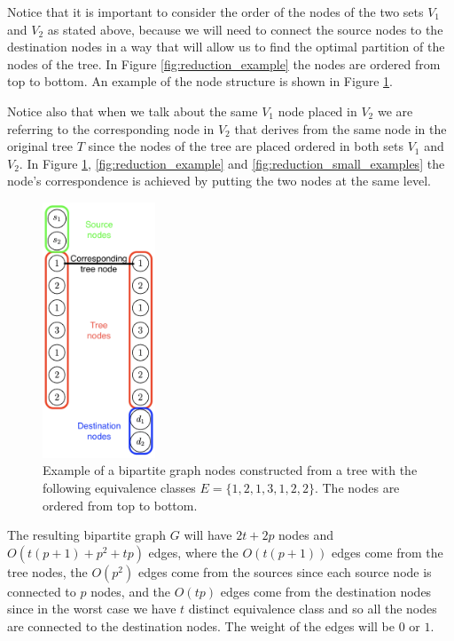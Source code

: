 Notice that it is important to consider the order of the nodes of the two sets $V_1$ and $V_2$ as stated above, because we will need to connect the source nodes to the destination nodes in a way that will allow us to find the optimal partition of the nodes of the tree. In Figure \ref{fig:reduction_example} the nodes are ordered from top to bottom. An example of the node structure is shown in Figure \ref{fig:reduction_example_parts}.

Notice also that when we talk about the same $V_1$ node placed in $V_2$ we are referring to the corresponding node in $V_2$ that derives from the same node in the original tree $T$ since the nodes of the tree are placed ordered in both sets $V_1$ and $V_2$. In Figure \ref{fig:reduction_example_parts}, \ref{fig:reduction_example} and \ref{fig:reduction_small_examples} the node's correspondence is achieved by putting the two nodes at the same level.

\begin{figure}[H]
    \centering
    \includegraphics[width=0.3\textwidth]{Immagini/bipartite_keys_part.png}
    \caption[Bipartite nodes structure]{Example of a bipartite graph nodes constructed from a tree with the following equivalence classes $E = \{1,2,1,3,1,2,2\}$. The nodes are ordered from top to bottom.}
    \label{fig:reduction_example_parts}
\end{figure}

\begin{definition}
    The resulting bipartite graph $G$ will have $2t + 2p$ nodes and $O(t (p + 1) + p^2 + tp)$ edges, where the $O(t (p + 1))$ edges come from the tree nodes, the $O(p^2)$ edges come from the sources since each source node is connected to $p$ nodes, and the $O(tp)$ edges come from the destination nodes since in the worst case we have $t$ distinct equivalence class and so all the nodes are connected to the destination nodes. The weight of the edges will be $0$ or $1$.
\end{definition}

